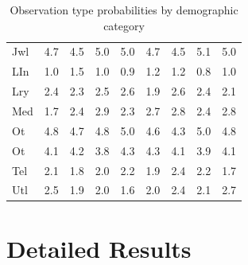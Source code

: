 \begin{table}[!ht]
{\begin{tabular}{lllllllll}
        Jwl & 4.7 & 4.5 & 5.0 & 5.0 & 4.7 & 4.5 & 5.1 & 5.0\\
        LIn & 1.0 & 1.5 & 1.0 & 0.9 & 1.2 & 1.2 & 0.8 & 1.0\\
        Lry & 2.4 & 2.3 & 2.5 & 2.6 & 1.9 & 2.6 & 2.4 & 2.1\\
        Med & 1.7 & 2.4 & 2.9 & 2.3 & 2.7 & 2.8 & 2.4 & 2.8\\
        Ot  & 4.8 & 4.7 & 4.8 & 5.0 & 4.6 & 4.3 & 5.0 & 4.8\\
        Ot  & 4.1 & 4.2 & 3.8 & 4.3 & 4.3 & 4.1 & 3.9 & 4.1\\
        Tel & 2.1 & 1.8 & 2.0 & 2.2 & 1.9 & 2.4 & 2.2 & 1.7\\
        Utl & 2.5 & 1.9 & 2.0 & 1.6 & 2.0 & 2.4 & 2.1 & 2.7\\
        \hline
    \end{tabular}
    }%
    \caption{Observation type probabilities by demographic category}
    \label{tab:dem_vin}
\end{table}

\section{Detailed Results}
\label{det_res}

